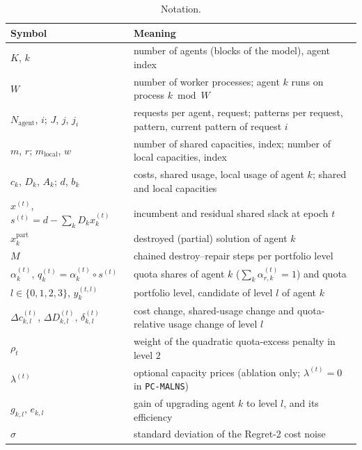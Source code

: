 \documentclass[a4paper,fleqn]{cas-sc}
\newcommand{\pcm}{\texttt{PC-MALNS}}
\begin{document}
\begin{table}[pos=!htb]
\centering
\caption{Notation.}
\label{tab:notation}
\footnotesize
\begin{tabular}{@{}ll@{}}
\toprule
\textbf{Symbol} & \textbf{Meaning} \\
\midrule
$K$, $k$ & number of agents (blocks of the model), agent index \\
$W$ & number of worker processes; agent $k$ runs on process $k \bmod W$ \\
$N_{\text{agent}}$, $i$; $J$, $j$, $j_i$ & requests per agent, request; patterns per request, pattern, current pattern of request $i$ \\
$m$, $r$; $m_{\text{local}}$, $w$ & number of shared capacities, index; number of local capacities, index \\
$c_k$, $D_k$, $A_k$; $d$, $b_k$ & costs, shared usage, local usage of agent $k$; shared and local capacities \\
$x^{(t)}$, $s^{(t)} = d - \sum_k D_k x_k^{(t)}$ & incumbent and residual shared slack at epoch $t$ \\
$x_k^{\text{part}}$ & destroyed (partial) solution of agent $k$ \\
$M$ & chained destroy--repair steps per portfolio level \\
$\alpha_k^{(t)}$, $q_k^{(t)} = \alpha_k^{(t)} \circ s^{(t)}$ & quota shares of agent $k$ ($\sum_k \alpha_{r,k}^{(t)} = 1$) and quota \\
$l \in \{0,1,2,3\}$, $y_k^{(t,l)}$ & portfolio level, candidate of level $l$ of agent $k$ \\
$\Delta c_{k,l}^{(t)}$, $\Delta D_{k,l}^{(t)}$, $\delta_{k,l}^{(t)}$ & cost change, shared-usage change and quota-relative usage change of level $l$ \\
$\rho_t$ & weight of the quadratic quota-excess penalty in level $2$ \\
$\lambda^{(t)}$ & optional capacity prices (ablation only; $\lambda^{(t)} = 0$ in \pcm) \\
$g_{k,l}$, $e_{k,l}$ & gain of upgrading agent $k$ to level $l$, and its efficiency \\
$\sigma$ & standard deviation of the Regret-2 cost noise \\
\bottomrule
\end{tabular}
\end{table}
\end{document}
